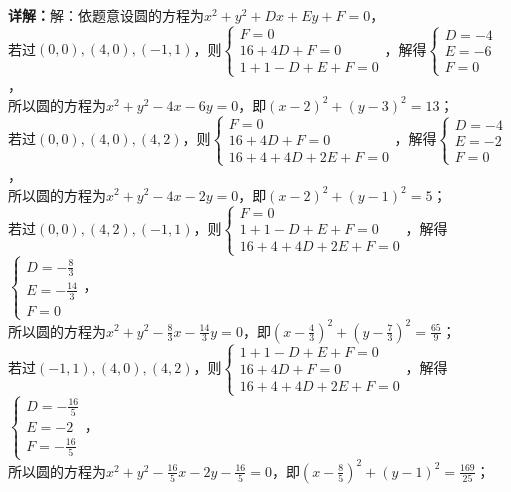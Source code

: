 \begin{question}[points=5]
\begin{solution}
\textbf{详解：}解：依题意设圆的方程为$x^2+y^2+Dx+Ey+F=0$，\\若过$(0,0),(4,0),(-1,1)$，则$\begin{cases} F=0 \\ 16+4D+F=0 \\ 1+1-D+E+F=0 \end{cases}$，解得$\begin{cases} D=-4 \\ E=-6 \\ F=0 \end{cases}$，\\所以圆的方程为$x^2+y^2-4x-6y=0$，即$(x-2)^2+(y-3)^2=13$；\\若过$(0,0),(4,0),(4,2)$，则$\begin{cases} F=0 \\ 16+4D+F=0 \\ 16+4+4D+2E+F=0 \end{cases}$，解得$\begin{cases} D=-4 \\ E=-2 \\ F=0 \end{cases}$，\\所以圆的方程为$x^2+y^2-4x-2y=0$，即$(x-2)^2+(y-1)^2=5$；\\若过$(0,0),(4,2),(-1,1)$，则$\begin{cases} F=0 \\ 1+1-D+E+F=0 \\ 16+4+4D+2E+F=0 \end{cases}$，解得$\begin{cases} D=-\frac{8}{3} \\ E=-\frac{14}{3} \\ F=0 \end{cases}$，\\所以圆的方程为$x^2+y^2-\frac{8}{3}x-\frac{14}{3}y=0$，即$\left(x-\frac{4}{3}\right)^2+\left(y-\frac{7}{3}\right)^2=\frac{65}{9}$；\\若过$(-1,1),(4,0),(4,2)$，则$\begin{cases} 1+1-D+E+F=0 \\ 16+4D+F=0 \\ 16+4+4D+2E+F=0 \end{cases}$，解得$\begin{cases} D=-\frac{16}{5} \\ E=-2 \\ F=-\frac{16}{5} \end{cases}$，\\所以圆的方程为$x^2+y^2-\frac{16}{5}x-2y-\frac{16}{5}=0$，即$\left(x-\frac{8}{5}\right)^2+(y-1)^2=\frac{169}{25}$；
\end{solution}
\end{question}

